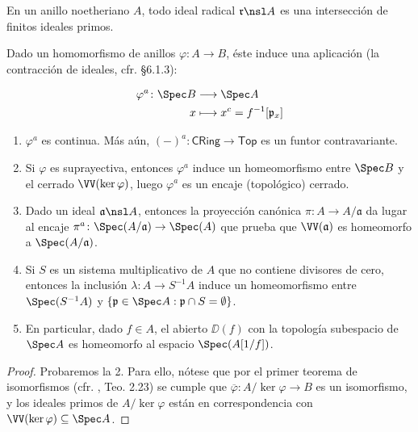 \begin{cor}
	En un anillo noetheriano $A$, todo ideal radical $\mathfrak{r} \nsl A$ es una intersección de finitos ideales primos.
\end{cor}
\begin{prop}
	Dado un homomorfismo de anillos $\varphi \colon A \to B$, éste induce una aplicación (la contracción de ideales, cfr. \cite{Alg} \S6.1.3):
	\begin{multicols}{2}
		\begin{align*}
			\varphi^a \colon \Spec B &\longrightarrow \Spec A \\
			x &\longmapsto x^c = f^{-1}[\mathfrak{p}_x]
		\end{align*}
		\begin{center}
		\end{center}
	\end{multicols}
	\begin{enumerate}
		\item $\varphi^a$ es continua. Más aún, $(-)^a \colon \mathsf{CRing} \to \mathsf{Top}$ es un funtor contravariante.
		\item Si $\varphi$ es suprayectiva, entonces $\varphi^a$ induce un homeomorfismo entre $\Spec B$ y el cerrado $\VV(\ker\varphi)$,
			luego $\varphi^a$ es un encaje (topológico) cerrado.
		\item Dado un ideal $\mathfrak{a} \nsl A$, entonces la proyección canónica $\pi \colon A \to A/\mathfrak{a}$ da lugar al encaje
			$\pi^a \colon \Spec(A/\mathfrak{a}) \to \Spec(A)$ que prueba que $\VV(\mathfrak{a})$ es homeomorfo a $\Spec(A/\mathfrak{a})$.
		\item Si $S$ es un sistema multiplicativo de $A$ que no contiene divisores de cero, entonces la inclusión $\lambda \colon A \to S^{-1}A$
			induce un homeomorfismo entre $\Spec(S^{-1} A)$ y $\{ \mathfrak{p} \in \Spec A : \mathfrak{p} \cap S = \emptyset \}$.
		\item En particular, dado $f \in A$, el abierto $\DD(f)$ con la topología subespacio de $\Spec A$ es homeomorfo al espacio $\Spec(A[1/f])$.
	\end{enumerate}
\end{prop}
\begin{proof}
	Probaremos la 2. Para ello, nótese que por el primer teorema de isomorfismos (cfr. \cite{Alg}, Teo. 2.23)
	se cumple que $\overline{\varphi}\colon A/\ker \varphi \to B$ es un isomorfismo, y los ideales primos de $A/\ker \varphi$ están en correspondencia con
	$\VV(\ker \varphi) \subseteq \Spec A$.
\end{proof}

